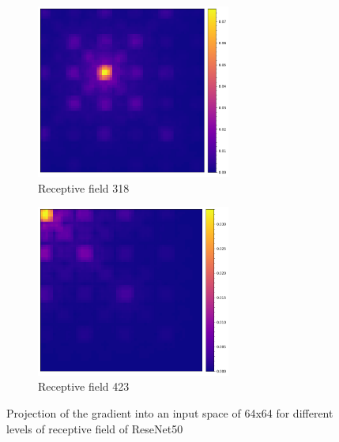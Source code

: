 \begin{figure}[H]
        \begin{subfigure}[b]{0.475\textwidth}   
            \centering 
            \includegraphics[width=0.7\textwidth]{images/gradientProjection_resnet_50_318.png}
            \caption[]%
            {{\small Receptive field 318}}    
            \label{fig:similarity_lvl3}
        \end{subfigure}
        \hfill
        \begin{subfigure}[b]{0.475\textwidth}   
            \centering 
            \includegraphics[width=0.7\textwidth]{images/gradientProjection_resnet_50_423.png}
            \caption[]%
            {{\small Receptive field 423}}    
            \label{fig:similarity_lvl4}
        \end{subfigure}
        \caption{\small Projection of the gradient into an input space of 64x64 for different levels of receptive field
        of ReseNet50}
        \label{fig:gradient_projection_resenet50}
    \end{figure}
